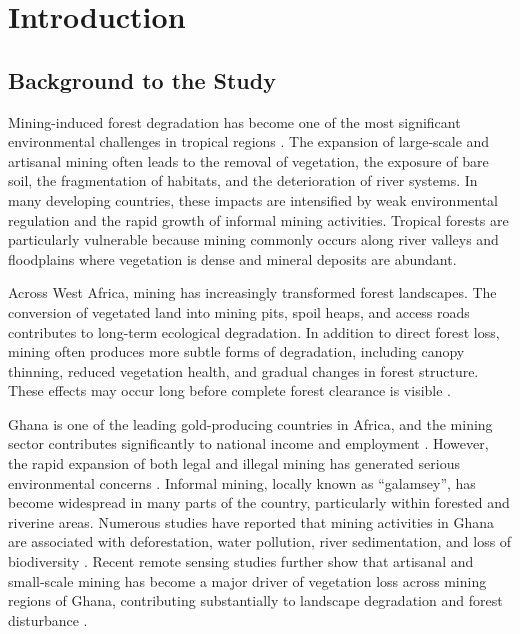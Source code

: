 \documentclass[a4paper,12pt]{report}
\begin{document}
\tableofcontents
\listoffigures
\listoftables
\clearpage
{}

\chapter{Introduction}

\section{Background to the Study}

Mining-induced forest degradation has become one of the most significant environmental challenges in tropical regions \citep{asner2005selective,sonter2017mining}. The expansion of large-scale and artisanal mining often leads to the removal of vegetation, the exposure of bare soil, the fragmentation of habitats, and the deterioration of river systems. In many developing countries, these impacts are intensified by weak environmental regulation and the rapid growth of informal mining activities. Tropical forests are particularly vulnerable because mining commonly occurs along river valleys and floodplains where vegetation is dense and mineral deposits are abundant.

Across West Africa, mining has increasingly transformed forest landscapes. The conversion of vegetated land into mining pits, spoil heaps, and access roads contributes to long-term ecological degradation. In addition to direct forest loss, mining often produces more subtle forms of degradation, including canopy thinning, reduced vegetation health, and gradual changes in forest structure. These effects may occur long before complete forest clearance is visible \citep{tarazona2020monitoring}.

Ghana is one of the leading gold-producing countries in Africa, and the mining sector contributes significantly to national income and employment \citep{bansah2016hazardous,mcquilken2016asm}.
However, the rapid expansion of both legal and illegal mining has generated serious environmental concerns \citep{hilson2002land,hilson2002environmental}. Informal mining, locally known as ``galamsey'', has become widespread in many parts of the country, particularly within forested and riverine areas. Numerous studies have reported that mining activities in Ghana are associated with deforestation, water pollution, river sedimentation, and loss of biodiversity \citep{mcquilken2016asm,forkuor2012comparison,bansah2016hazardous,barenblitt2021ghana}. Recent remote sensing studies further show that artisanal and small-scale mining has become a major driver of vegetation loss across mining regions of Ghana, contributing substantially to landscape degradation and forest disturbance \citep{barenblitt2021ghana}.
\end{document}
